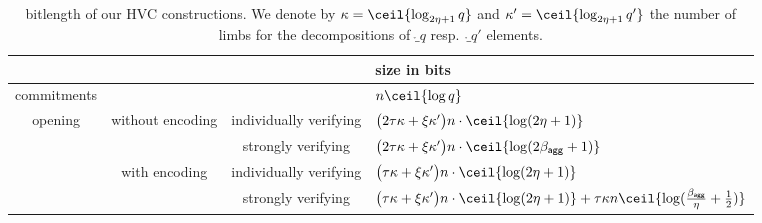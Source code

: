 \begin{remark}
\begin{table}\centering
 \begin{tabular}{ccc@{\hskip 3.5ex}l}
  & & & size in bits \\\toprule
  commitments & & & $n\ceil{\log q}$\\
  \hline
  \multirow{4}{*}{opening}& \multirow{2}{*}{without encoding} &individually verifying & $\bigl(2\tau\limbs + \xi\limbs'\bigr)n\cdot \ceil{\log(2\eta+1)}$\\\cline{3-4}
                          &                                   &strongly verifying & $\bigl(2\tau\limbs + \xi\limbs'\bigr)n\cdot \ceil{\log(2\bagg+1)}$  \\\cline{2-4}
                          & \multirow{2}{*}{with encoding}    &individually verifying & $\bigl(\tau\limbs + \xi\limbs'\bigr)n\cdot \ceil{\log(2\eta+1)}$\\\cline{3-4}
                          &                                   &strongly verifying & $\bigl(\tau\limbs + \xi\limbs'\bigr)n\cdot \ceil{\log(2\eta+1)}+ \tau\limbs n\ceil{\log (\frac{\bagg}{\eta}+\frac12)}$\\
                          \hline
 \end{tabular}
 \caption{bitlength of our HVC constructions. We denote by $\limbs = \ceil{\log_{2\eta+1}q}$ and $\limbs' = \ceil{\log_{2\eta+1}q'}$ the number of limbs for the decompositions of $\ring_q$ resp.\ $\ring_{q'}$ elements.}
 \label{table:hvcsizes}
\end{table}

\end{remark}
